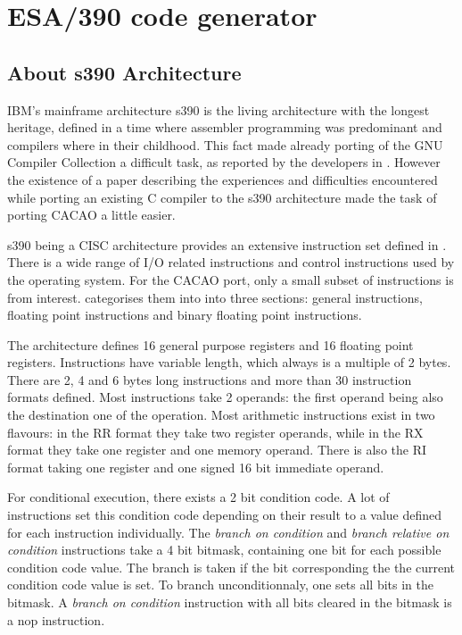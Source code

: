 

\section{ESA/390 code generator}

\subsection{About s390 Architecture}

IBM's mainframe architecture s390 is the living architecture with the longest heritage, defined in a time where assembler programming was predominant and compilers where in their childhood. This fact made already porting of the GNU Compiler Collection a difficult task, as reported by the developers in \cite{s390:bib:gcc}. However the existence of a paper describing the experiences and difficulties encountered while porting an existing C compiler to the s390 architecture made the task of porting CACAO a little easier.

s390 being a CISC architecture provides an extensive instruction set defined in \cite{s390:bib:principles}. There is a wide range of I/O related instructions and control instructions used by the operating system. For the CACAO port, only a small subset of instructions is from interest. \cite{s390:bib:principles} categorises them into into three sections: general instructions, floating point instructions and binary floating point instructions. 

The architecture defines 16 general purpose registers and 16 floating point registers. Instructions have variable length, which always is a multiple of 2 bytes. There are 2, 4 and 6 bytes long instructions and more than 30 \cite{s390:bib:gcc} instruction formats defined. Most instructions take 2 operands: the first operand being also the destination one of the operation. Most arithmetic instructions exist in two flavours: in the RR format they take two register operands, while in the RX format they take one register and one memory operand. There is also the RI format taking one register and one signed 16 bit immediate operand.

For conditional execution, there exists a 2 bit condition code. A lot of instructions set this condition code depending on their result to a value defined for each instruction individually. The \emph{branch on condition} and \emph{branch relative on condition} instructions take a 4 bit bitmask, containing one bit for each possible condition code value. The branch is taken if the bit corresponding the the current condition code value is set. To branch unconditionnaly, one sets all bits in the bitmask. A \emph{branch on condition} instruction with all bits cleared in the bitmask is a nop instruction.

